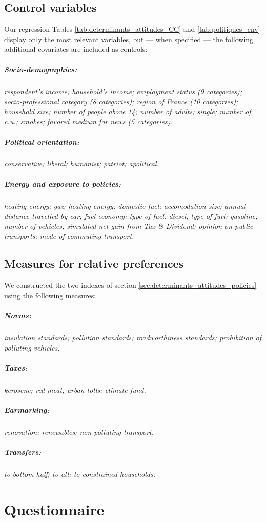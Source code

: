 \documentclass[english,5p,authoryear]{elsarticle}
\begin{document}
\begin{appendices}
\subsection{Control variables\label{app:covariates}}

Our regression Tables \ref{tab:determinants_attitudes_CC} and \ref{tab:politiques_env} display only the most relevant variables, but --- when specified --- the following additional covariates are included as controls:

\subparagraph{Socio-demographics:} \textit{respondent's income; household's income; employment status \textnormal{(9 categories)}; socio-professional category \textnormal{(8 categories)}; region of France \textnormal{(10 categories)}; household size; number of people above 14; number of adults; single; number of c.u.; smokes; favored medium for news \textnormal{(5 categories)}.}

\subparagraph{Political orientation:} \textit{conservative; liberal; humanist; patriot; apolitical.}

\subparagraph{Energy and exposure to policies:} \textit{heating energy: gaz; heating energy: domestic fuel; accomodation size; annual distance travelled by car; fuel economy; type of fuel: diesel; type of fuel: gasoline; number of vehicles; simulated net gain from Tax \& Dividend; opinion on public transports; mode of commuting transport.}

\subsection{Measures for relative preferences\label{app:measures}}

We constructed the two indexes of section \ref{sec:determinants_attitudes_policies} using the following measures:

\subparagraph{Norms:} \textit{insulation standards;  pollution standards; roadworthiness standards; prohibition of polluting vehicles.}

\subparagraph{Taxes:} \textit{kerosene; red meat; urban tolls; climate fund.}

\subparagraph{Earmarking:} \textit{renovation; renewables; non polluting transport.}

\subparagraph{Transfers:} \textit{to bottom half; to all; to constrained households.}

\section{Questionnaire\label{app:questionnaire}}


\end{appendices}
\end{document}
